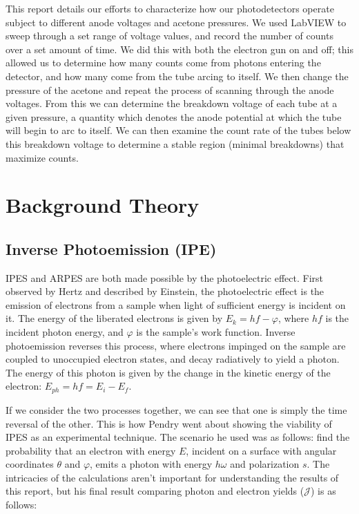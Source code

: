 This report details our efforts to characterize how our photodetectors operate subject to different anode voltages and acetone pressures. We used LabVIEW to sweep through a set range of 
voltage values, and record the number of counts over a set amount of time. We did this with both the electron gun on and off; this allowed us to determine how many counts come from photons entering
the detector, and how many come from the tube arcing to itself. We then change the pressure of the acetone and repeat the process of scanning through the anode voltages. From this we can determine
the breakdown voltage of each tube at a given pressure, a quantity which denotes the anode potential at which the tube will begin to arc to itself. We can then examine the count rate of the tubes below 
this breakdown voltage to determine a stable region (minimal breakdowns) that maximize counts. 

\section{Background Theory}

\subsection{Inverse Photoemission (IPE)}
IPES and ARPES are both made possible by the photoelectric effect. First observed by Hertz and described by Einstein, the photoelectric effect is the emission of electrons from a sample
when light of sufficient energy is incident on it. The energy of the liberated electrons is given by $E_k = hf - \varphi$, where $hf$ is the incident photon energy, and $\varphi$ is the 
sample's work function. Inverse photoemission reverses this process, where electrons impinged on the sample are coupled to unoccupied electron states, and decay radiatively to yield a photon.
The energy of this photon is given by the change in the kinetic energy of the electron: $E_{ph} = hf = E_i - E_f$. 

If we consider the two processes together, we can see that one is simply the time reversal of the other. This is how Pendry\cite{pendry1981theory} went about showing the viability of IPES as an experimental technique. 
The scenario he used was as follows: find the probability that an electron with energy $E$, incident on a surface with angular coordinates $\theta$ and $\varphi$, emits a photon with 
energy $h\omega$ and polarization $s$. The intricacies of the calculations aren't important for understanding the results of this report, but his final result comparing photon and electron 
yields ($\mathscr{J}$) is as follows: 

